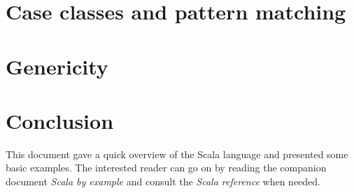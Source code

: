 \documentclass[a4paper,12pt]{article}
\newcommand{\langname}[1]{#1\xspace}
\newcommand{\Scala}{\langname{Scala}}
\begin{document}
\section{Case classes and pattern matching}
\label{sec:case-classes-pattern}


\section{Genericity}
\label{sec:genericity}



\section{Conclusion}
\label{sec:conclusion}

This document gave a quick overview of the \Scala language and
presented some basic examples. The interested reader can go on by
reading the companion document \textit{Scala by example\/} and consult
the \textit{Scala reference\/} when needed.
\end{document}
